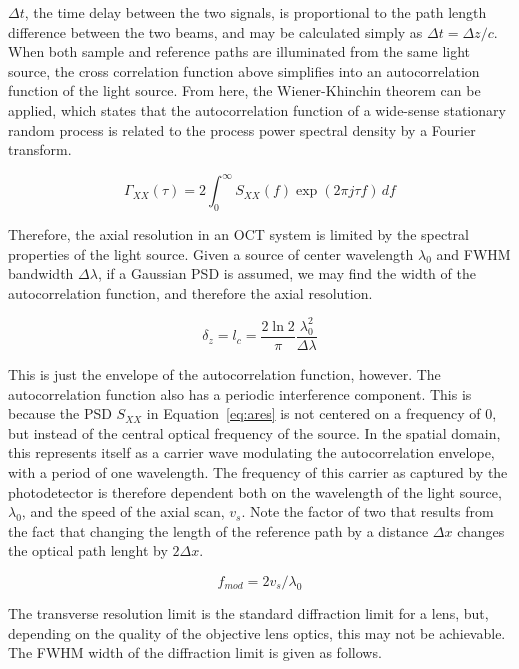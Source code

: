 $\Delta t$, the time delay between the two signals, is proportional to the path length difference between the two beams, and may be calculated simply as $\Delta t = \Delta z / c$. When both sample and reference paths are illuminated from the same light source, the cross correlation function above simplifies into an autocorrelation function of the light source. From here, the Wiener-Khinchin theorem can be applied, which states that the autocorrelation function of a wide-sense stationary random process is related to the process power spectral density by a Fourier transform.

\begin{equation}
\Gamma_{XX}(\tau) = 2 \int_{0}^\infty S_{XX}(f) \exp(2 \pi j \tau f) \,df
\end{equation}

Therefore, the axial resolution in an OCT system is limited by the spectral properties of the light source. Given a source of center wavelength $\lambda_0$ and FWHM bandwidth $\Delta \lambda$, if a Gaussian PSD is assumed, we may find the width of the autocorrelation function, and therefore the axial resolution. \cite{fercher}

\begin{equation} \label{eq:ares}
\delta_z = l_c = \frac{2 \ln{2}}{\pi} \frac{\lambda_0^2}{\Delta \lambda}
\end{equation}

This is just the envelope of the autocorrelation function, however. The autocorrelation function also has a periodic interference component. This is because the PSD $S_{XX}$ in Equation~\ref{eq:ares} is not centered on a frequency of 0, but instead of the central optical frequency of the source. In the spatial domain, this represents itself as a carrier wave modulating the autocorrelation envelope, with a period of one wavelength. The frequency of this carrier as captured by the photodetector is therefore dependent both on the wavelength of the light source, $\lambda_0$, and the speed of the axial scan, $v_s$. Note the factor of two that results from the fact that changing the length of the reference path by a distance $\Delta x$ changes the optical path lenght by $ 2 \Delta x$. \cite{fercher}

\begin{equation} \label{eq:carrier}
f_{mod} = 2 v_s / \lambda_0
\end{equation}

The transverse resolution limit is the standard diffraction limit for a lens, but, depending on the quality of the objective lens optics, this may not be achievable. The FWHM width of the diffraction limit is given as follows. \cite{hecht}

